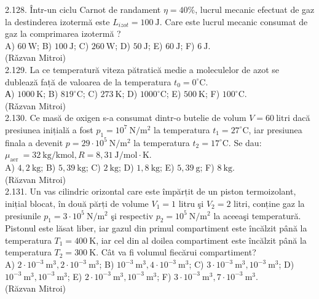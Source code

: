 2.128. Într-un ciclu Carnot de randament $\eta=40 \%$, lucrul mecanic efectuat de gaz la destinderea izotermă este $L_{i z o t}=100 \mathrm{~J}$. Care este lucrul mecanic consumat de gaz la comprimarea izotermă ?\\ A) $60 \mathrm{~W}$; B) $100 \mathrm{~J}$; C) $260 \mathrm{~W}$; D) $50 \mathrm{~J}$; E) $60 \mathrm{~J}$; F) $6 \mathrm{~J}$.\\ (Rǎzvan Mitroi)\\

2.129. La ce temperatură viteza pătratică medie a moleculelor de azot se dublează față de valoarea de la temperatura $t_{0}=0^{\circ} \mathrm{C}$.\\ А) $1000 \mathrm{~K}$; B) $819^{\circ} \mathrm{C}$; C) $273 \mathrm{~K}$; D) $1000^{\circ} \mathrm{C}$; E) $500 \mathrm{~K}$; F) $100^{\circ} \mathrm{C}$.\\ (Rǎzvan Mitroi)\\

2.130. Ce masă de oxigen s-a consumat dintr-o butelie de volum $V=60 \mathrm{~litri}$ dacă presiunea inițială a fost $p_{1}=10^{7} \mathrm{~N} / \mathrm{m}^{2}$ la temperatura $t_{1}=27^{\circ} \mathrm{C}$, iar presiunea finala a devenit $p=29 \cdot 10^{5} \mathrm{~N} / \mathrm{m}^{2}$ la temperatura $t_{2}=17^{\circ} \mathrm{C}$. Se dau: $\mu_{\text {aer }}=32 \mathrm{~kg} / \mathrm{kmol}, R=8,31 \mathrm{~J} / \mathrm{mol} \cdot \mathrm{K}$.\\ A) $4,2 \mathrm{~kg}$; B) $5,39 \mathrm{~kg}$; C) $2 \mathrm{~kg}$; D) $1,8 \mathrm{~kg}$; E) $5,39 \mathrm{~g}$; F) $8 \mathrm{~kg}$.\\ (Răzvan Mitroi)\\

2.131. Un vas cilindric orizontal care este împărțit de un piston termoizolant, inițial blocat, în două părți de volume $V_{1}=1$ litru şi $V_{2}=2$ litri, conține gaz la presiunile $p_{1}=3 \cdot 10^{5} \mathrm{~N} / \mathrm{m}^{2}$ şi respectiv $p_{2}=10^{5} \mathrm{~N} / \mathrm{m}^{2}$ la aceeaşi temperatură. Pistonul este lăsat liber, iar gazul din primul compartiment este încălzit până la temperatura $T_{1}=400 \mathrm{~K}$, iar cel din al doilea compartiment este încălzit până la temperatura $T_{2}=300 \mathrm{~K}$. Cât va fi volumul fiecărui compartiment?\\ A) $2 \cdot 10^{-3} \mathrm{~m}^{3}, 2 \cdot 10^{-3} \mathrm{~m}^{3}$; B) $10^{-3} \mathrm{~m}^{3}, 4 \cdot 10^{-3} \mathrm{~m}^{3}$; C) $3 \cdot 10^{-3} \mathrm{~m}^{3}, 10^{-3} \mathrm{~m}^{3}$; D) $10^{-3} \mathrm{~m}^{3}, 10^{-3} \mathrm{~m}^{3}$; E) $2 \cdot 10^{-3} \mathrm{~m}^{3}, 10^{-3} \mathrm{~m}^{3}$; F) $3 \cdot 10^{-3} \mathrm{~m}^{3}, 7 \cdot 10^{-3} \mathrm{~m}^{3}$.\\ (Răzvan Mitroi)\\

